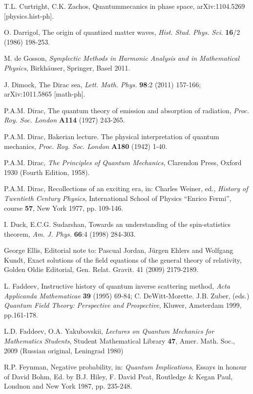 \begin{thebibliography}{000}
 T.L. Curtright, C.K. Zachos, Quantummecanics in phase space, arXiv:1104.5269 [physics.hist-ph].

 O. Darrigol, The origin of quantized matter waves, {\it Hist.
Stud. Phys. Sci.} {\bf 16}/2 (1986) 198-253.

 M. de Gosson, {\it Symplectic Methods in Harmonic Analysis and in Mathematical 
Physics}, Birkh\"auser, Springer, Basel 2011.
 
 J. Dimock, The Dirac sea, {\it Lett. Math. Phys.} {\bf 98}:2
(2011) 157-166; arXiv:1011.5865 [math-ph].

 P.A.M. Dirac, The quantum theory of emission and absorption
of radiation, {\it Proc. Roy. Soc. London} {\bf A114} (1927) 243-265.

 P.A.M. Dirac, Bakerian lecture. The physical interpretation of 
quantum mechanics, {\it Proc. Roy. Soc. London} {\bf A180} (1942) 1-40.

 P.A.M. Dirac, {\it The Principles of Quantum Mechanics}, 
Clarendon Press, Oxford 1930 (Fourth Edition, 1958).

 P.A.M. Dirac, Recollections of an exciting era, in: Charles 
Weiner, ed., {\it History of Twentieth Century Physics}, International School 
of Physics ``Enrico Fermi'', course {\bf 57}, New York 1977, pp. 109-146.

 I. Duck, E.C.G. Sudarshan, Towards an understanding of the
spin-statistics theorem, {\it Am. J. Phys.} {\bf 66}:4 (1998) 284-303.

 George Ellis, Editorial note to: Pascual Jordan, Jürgen Ehlers and Wolfgang Kundt, Exact
solutions of the field equations of the general theory of relativity, Golden Oldie Editorial, Gen. Relat.
Gravit. 41 (2009) 2179-2189. 

 L. Faddeev, Instructive history of quantum inverse scattering method, {\it Acta Applicanda Mathematicae} {\bf 39} (1995) 69-84; C. DeWitt-Morette. J.B. Zuber, (eds.) {\it Quantum Field Theory: Perspective and Prospective}, Kluwer, Amsterdam 1999, pp.161-178.

 L.D. Faddeev, O.A. Yakubovskii, {\it Lectures on Quantum Mechanics for Mathematics Students}, Student Mathematical Library {\bf 47}, Amer. Math. Soc., 2009 (Russian original, Leningrad 1980)

 R.P. Feynman, Negative probability, in: {\it Quantum Implications}, Essays in honour of David Bohm, 
Ed. by B.J. Hiley, F. David Peat, Routledge \& Kegan Paul, Londnon and New York 1987, pp. 235-248.


\end{thebibliography}
